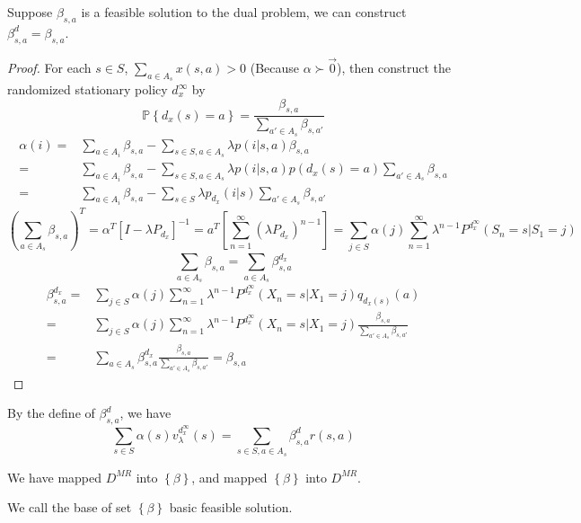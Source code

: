 Suppose $ \beta_{s,a} $ is a feasible solution to the dual problem, we can construct $ \beta^{d}_{s,a} = \beta_{s,a} $.
\begin{proof}
    For each $ s \in S $, $ \sum^{}_{a \in A_s} x(s, a) > 0 $ (Because $ \alpha \succ \vec{0} $), then construct the randomized stationary policy $ d^{\infty}_{x} $ by
    \[
        \mathbb{P}\left\{ d_x(s) = a \right\} = \frac{\beta_{s,a}}{ \sum^{}_{a' \in A_s} \beta_{s,a'}} 
    \]
    \begin{align*}
        \alpha(i) =& \sum^{}_{a \in A_i} \beta_{s,a} - \sum^{}_{s\in S, a \in A_s} \lambda p(i | s,a) \beta_{s,a}\\
        =& \sum^{}_{a \in A_i} \beta_{s,a} - \sum^{}_{s\in S, a \in A_s} \lambda p(i | s,a) p(d_x(s) = a) \sum^{}_{a' \in A_s} \beta_{s,a}\\
        =& \sum^{}_{a \in A_i} \beta_{s,a} - \sum^{}_{s \in S} \lambda p_{d_x}(i|s) \sum^{}_{a' \in A_s} \beta_{s,a'}
    \end{align*}
    \[
        {\left(\sum^{}_{a \in A_s} \beta_{s,a}\right)}^T = \alpha^T {\left[ I - \lambda P_{d_x} \right]}^{-1}
        = a^T \left[ \sum^{\infty}_{n=1} {(\lambda P_{d_x})}^{n-1}  \right] 
        = \sum^{}_{j \in S} \alpha(j) \sum^{\infty}_{n=1} \lambda^{n-1}P^{d^{\infty}_x}(S_n = s|S_1 = j)
    \]
    \[
        \sum^{}_{a \in A_s} \beta_{s,a} = \sum^{}_{a \in A_s} \beta^{d_x}_{s,a}
    \]
    \begin{align*}
        \beta^{d_x}_{s,a} =& \sum^{}_{j \in S} \alpha(j) \sum^{\infty}_{n=1} \lambda^{n-1}P^{d^{\infty}_x} (X_n = s | X_1 = j) q_{d_{x}(s)}(a) \\
        =& \sum^{}_{j \in S} \alpha(j) \sum^{\infty}_{n=1} \lambda^{n-1}P^{d^{\infty}_x} (X_n = s | X_1 = j)  \frac{\beta_{s,a}}{\sum^{}_{a' \in A_s} \beta_{s,a'}} \\
        =& \sum^{}_{a \in A_s} \beta^{d_x}_{s,a} \frac{\beta_{s,a}}{\sum^{}_{a' \in A_s} \beta_{s,a'}} = \beta_{s,a}
    \end{align*}
\end{proof}

By the define of $ \beta^{d}_{s,a} $, we have
\[
    \sum^{}_{s \in S} \alpha(s) v^{d^\infty_x}_{\lambda}(s) = \sum^{}_{s\in S, a \in A_s} \beta^d_{s,a} r(s,a)
\]

We have mapped $ D^{MR} $ into $ \left\{ \beta \right\} $, and mapped $ \left\{ \beta \right\} $ into $ D^{MR} $.

We call the base of set $ \left\{ \beta \right\} $ basic feasible solution.

